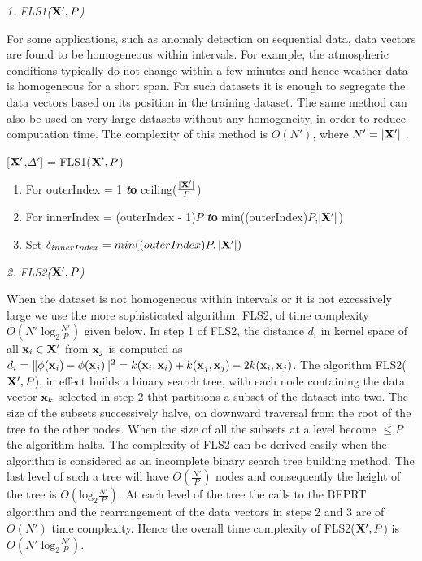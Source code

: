 \documentclass[twoside]{article}
\begin{document}
\noindent
{\it 1. FLS1(${\bf X}' ,P$)}

For some applications, such as anomaly detection on sequential data, data vectors are found to be homogeneous within intervals. For example, the atmospheric conditions typically do not change within a few minutes and hence weather data is homogeneous for a short span. For such datasets it is enough to segregate the data vectors based on its position in the training dataset. The same method can also be used on very large datasets without any homogeneity, in order to reduce computation time. The complexity of this method is $O(N' )$, where $N'  = |{\bf X}' |$ .
\begin{algorithm}[h]
 \renewcommand{\thealgorithm}{}
\caption{[${\bf X}' $,$\Delta' $] = FLS1(${\bf X}' ,P$)}
\begin{enumerate} \addtolength{\itemsep}{-.35\baselineskip}
  \item For outerIndex = 1 {\bf{\emph to}} ceiling($\frac{|{\bf X}' |}{P}$)
  \item \hspace{5pt} For innerIndex = (outerIndex - 1)$P$ {\bf{\emph to}} min((outerIndex)$P$,$|{\bf X}' |$)
  \item \hspace{15pt} Set $\delta_{innerIndex} = min((outerIndex)P,|{\bf X}' |)$
\end{enumerate}
\end{algorithm}

\noindent
{\it 2. FLS2(${\bf X}' ,P$)}

When the dataset is not homogeneous within intervals or it is not excessively large we use the more sophisticated algorithm, FLS2, of time complexity $O(N' \; \text{log}_2 \frac{N' }{P})$ given below. In step 1 of FLS2, the distance $d_i$ in kernel space of all ${\bf x}_i \in {\bf X}' $ from ${\bf x}_j$ is computed as $d_i = \|\phi({\bf x}_i) - \phi({\bf x}_j)\|^2 = k({\bf x}_i, {\bf x}_i) + k({\bf x}_j, {\bf x}_j) - 2k({\bf x}_i, {\bf x}_j)$. The algorithm FLS2(${\bf X}' ,P$), in effect builds a binary search tree, with each node containing the data vector ${\bf x}_k$ selected in step 2 that partitions a subset of the dataset into two. The size of the subsets successively halve, on downward traversal from the root of the tree to the other nodes. When the size of all the subsets at a level become $\le P$ the algorithm halts. The complexity of FLS2 can be derived easily when the algorithm is considered as an incomplete binary search tree building method. The last level of such a tree will have $O(\frac{N' }{P})$ nodes and consequently the height of the tree is $O(\text{log}_2 \frac{N' }{P})$. At each level of the tree the calls to the BFPRT algorithm \citep{Blum73} and the rearrangement of the data vectors in steps 2 and 3 are of $O(N' )$ time complexity. Hence the overall time complexity of FLS2(${\bf X}' ,P$) is $O(N' \; \text{log}_2 \frac{N' }{P})$. \newline
\end{document}
